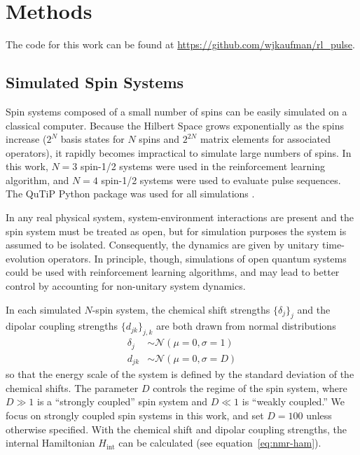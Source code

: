 
\chapter{Methods} %



The code for this work can be found at \url{https://github.com/wjkaufman/rl_pulse}.

\section{Simulated Spin Systems}

Spin systems composed of a small number of spins can be easily simulated on a classical computer. Because the Hilbert Space grows exponentially as the spins increase ($2^N$ basis states for $N$ spins and $2^{2N}$ matrix elements for associated operators), it rapidly becomes impractical to simulate large numbers of spins. In this work, $N=3$ spin-1/2 systems were used in the reinforcement learning algorithm, and $N=4$ spin-1/2 systems were used to evaluate pulse sequences. The QuTiP Python package was used for all simulations \cite{Johansson_2013}.

In any real physical system, system-environment interactions are present and the spin system must be treated as open, but for simulation purposes the system is assumed to be isolated. %
Consequently, the dynamics are given by unitary time-evolution operators. In principle, though, simulations of open quantum systems could be used with reinforcement learning algorithms, and may lead to better control by accounting for non-unitary system dynamics.

In each simulated $N$-spin system, the chemical shift strengths $\{\delta_j\}_j$ and the dipolar coupling strengths $\{d_{jk}\}_{j,k}$ are both drawn from normal distributions
\begin{align*}
    \delta_j &\sim \mathcal{N}(\mu=0, \sigma=1) \\
    d_{jk} &\sim \mathcal{N}(\mu=0, \sigma=D)
\end{align*}
so that the energy scale of the system is defined by the standard deviation of the chemical shifts. The parameter $D$ controls the regime of the spin system, where $D \gg 1$ is a ``strongly coupled'' spin system and $D \ll 1$ is ``weakly coupled.'' We focus on strongly coupled spin systems in this work, and set $D = 100$ unless otherwise specified. With the chemical shift and dipolar coupling strengths, the internal Hamiltonian $H_{\text{int}}$ can be calculated (see equation~\ref{eq:nmr-ham}).

